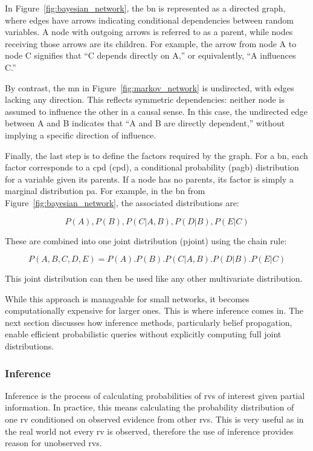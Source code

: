 \documentclass[12pt,a4paper]{article}
\begin{document}
In Figure~\ref{fig:bayesian_network}, the \acs{bn} is represented as a directed graph, where edges have arrows indicating conditional dependencies between random variables. A node with outgoing arrows is referred to as a parent, while nodes receiving those arrows are its children. For example, the arrow from node A to node C signifies that “C depends directly on A,” or equivalently, “A influences C.”

By contrast, the \acs{mn} in Figure~\ref{fig:markov_network} is undirected, with edges lacking any direction. This reflects symmetric dependencies: neither node is assumed to influence the other in a causal sense. In this case, the undirected edge between A and B indicates that “A and B are directly dependent,” without implying a specific direction of influence.

Finally, the last step is to define the factors required by the graph. For a \acs{bn}, each factor corresponds to a \acl{cpd} (\acs{cpd}), a conditional probability (\acs{pagb}) distribution for a variable given its parents. If a node has no parents, its factor is simply a marginal distribution \acs{pa}. For example, in the \acs{bn} from Figure~\ref{fig:bayesian_network}, the associated distributions are:

\begin{equation}P(A),  P(B),  P(C|A,B),  P(D|B),  P(E|C)\end{equation}

These are combined into one joint distribution (\acs{pjoint}) using the chain rule:

\begin{equation}P(A,B,C,D,E) = P(A).P(B).P(C|A,B).P(D|B).P(E|C)\end{equation}

This joint distribution can then be used like any other multivariate distribution.

While this approach is manageable for small networks, it becomes computationally expensive for larger ones. This is where inference comes in. The next section discusses how inference methods, particularly belief propagation, enable efficient probabilistic queries without explicitly computing full joint distributions.

\subsubsection{Inference}
Inference is the process of calculating probabilities of \acs{rv}s of interest given partial information. In practice, this means calculating the probability distribution of one \acs{rv} conditioned on observed evidence from other \acs{rv}s. This is very useful as in the real world not every \acs{rv} is observed, therefore the use of inference provides reason for unobserved \acs{rv}s.
\end{document}
